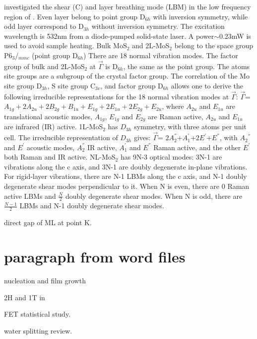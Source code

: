 \citeauthor{Zhang2013i} investigated the shear (C) and layer breathing mode (LBM) in the low frequency region of .\cite{Zhang2013i} Even layer  belong to point group D$_{6h}$ with inversion symmetry, while odd  layer  correspond to D$_{3h}$ without inversion symmetry. The excitation wavelength is 532nm from a diode-pumped solid-state laser. A power$\sim$0.23mW is used to avoid sample heating. Bulk MoS$_2$ and 2L-MoS$_2$ belong to the space group P6$_3$/$_{mmc}$ (point group D$_{6h}$) There are 18 normal vibration modes. The factor group of bulk and 2L-MoS$_2$ at $\vec{\Gamma}$ is D$_{6h}$, the same as the point group. The atoms site groups are a subgroup of the crystal factor group. The correlation of the Mo site group D$_{3h}$, S site group C$_{3v}$, and factor group D$_{6h}$ allows one to derive the following irreducible representations for the 18 normal vibration modes at $\vec{\Gamma}$: $\vec{\Gamma}$= $A_{1g}+2A_{2u}+2B_{2g}+B_{1u}+E_{1g}+2E_{1u}+2E_{2g}+E_{2u}$, where $A_{2u}$ and $E_{1u}$ are translational acoustic modes, $A_{1g}$, $E_{1g}$ and $E_{2g}$ are Raman active, $A_{2u}$ and $E_{1u}$ are infrared (IR) active. 1L-MoS$_2$ has $D_{3h}$ symmetry, with three atoms per unit cell. The irreducible representation of $D_{3h}$ gives: $\vec{\Gamma}$= $2A_2^{''}$+$A_1^{'}$+$2E^{'}$+$E^{''}$, with $A_2$$^{''}$ and $E^{'}$ acoustic modes, $A_2^{''}$ IR active, $A_1^{'}$ and $E^{''}$ Raman active, and the other $E^{'}$ both Raman and IR active. NL-MoS$_2$ has 9N-3 optical modes: 3N-1 are vibrations along the c axis, and 3N-1 are doubly degenerate in-plane vibrations. For rigid-layer vibrations, there are N-1 LBMs along the c axis, and N-1 doubly degenerate shear modes perpendicular to it. When N is even, there are 0 Raman active LBMs and $\frac{N}{2}$ doubly degenerate shear modes. When N is odd, there are $\frac{N-1}{2}$ LBMs and N-1 doubly degenerate shear modes.

direct gap of ML at point K.



\section{paragraph from word files}

nucleation and film growth \cite{Hanbucken1984} 

2H and 1T in  \cite{Eda2012}

 FET statistical study. \cite{Liu2013i}

water splitting review. \cite{B800489G} 

